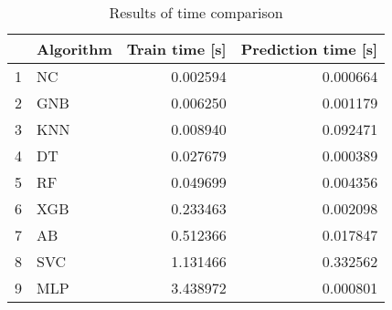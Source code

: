 \begin{table}
\footnotesize
\caption{Results of time comparison}
\label{tab:time comparison}
\begin{tabular}{llrr}
\hline
 & Algorithm & Train time [s] & Prediction time [s] \\
\hline
1 & NC & 0.002594 & 0.000664 \\
2 & GNB & 0.006250 & 0.001179 \\
3 & KNN & 0.008940 & 0.092471 \\
4 & DT & 0.027679 & 0.000389 \\
5 & RF & 0.049699 & 0.004356 \\
6 & XGB & 0.233463 & 0.002098 \\
7 & AB & 0.512366 & 0.017847 \\
8 & SVC & 1.131466 & 0.332562 \\
9 & MLP & 3.438972 & 0.000801 \\
\hline
\end{tabular}
\end{table}
